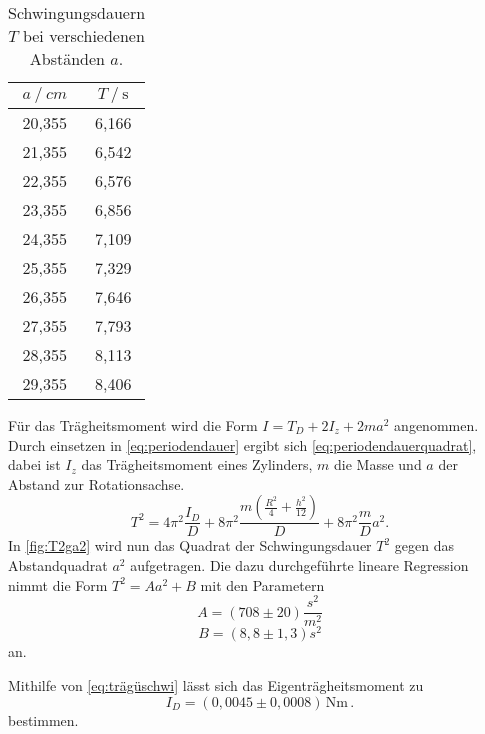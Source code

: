 \begin{table}[H] %
  \centering
  \begin{tabular}{S[table-format=2.3] S[table-format=2.2]}
      \toprule
      {$a \mathbin{/}\unit{cm}$} & {$T \mathbin{/} \unit{\second}$}\\
      ,355 & 6,166 \\
           21,355 & 6,542 \\
           22,355 & 6,576 \\
           23,355 & 6,856 \\  
           24,355 & 7,109 \\
           25,355 & 7,329 \\
           26,355 & 7,646 \\
           27,355 & 7,793 \\
           28,355 & 8,113 \\
           29,355 & 8,406 \\
      \bottomrule
  \end{tabular}
  \caption{Schwingungsdauern $T$ bei verschiedenen Abständen $a$.}
  \label{tab:Messung_b}
\end{table}
Für das Trägheitsmoment wird die Form $ I = T_D + 2I_z + 2m a^2$ angenommen. 
Durch einsetzen in \eqref{eq:periodendauer} ergibt sich \eqref{eq:periodendauerquadrat}, dabei ist $I_z$ das Trägheitsmoment eines Zylinders, $m$ die Masse und $a$ der Abstand zur Rotationsachse.
\begin{equation}
  T^2 = 4 \pi^2 \frac{I_D}{D} + 8 \pi^2 \frac{m (\frac{R^2}{4} + \frac{h^2}{12})}{D}+ 8 \pi^2 \frac{m}{D} a^2 .
  \label{eq:periodendauerquadrat}
\end{equation}
In \autoref{fig:T2ga2} wird nun das Quadrat der Schwingungsdauer $T^2$ gegen das Abstandquadrat $a^2$ aufgetragen.
Die dazu durchgeführte lineare Regression nimmt die Form $T^2 = A  a^2 + B $ mit den Parametern
\begin{equation*}
  A = (708 \pm 20) \dfrac{s^2}{m^2}
\end{equation*}
\begin{equation*}
 B = (8,8 \pm 1,3) s^2
\end{equation*}
an.

Mithilfe von \eqref{eq:trägüschwi} lässt sich das Eigenträgheitsmoment zu
\begin{equation*}
  I_D = (0,0045 \pm 0,0008) \,\unit{\newton\meter} \,.
\end{equation*}
bestimmen.

